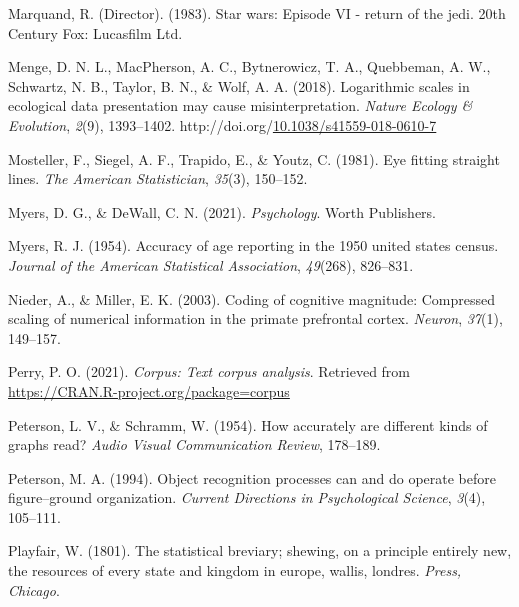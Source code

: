\documentclass[print]{nuthesis}
\newlength{\cslhangindent}
\newenvironment{CSLReferences}[2]%
{\setlength{\parindent}{0pt}%
\everypar{\setlength{\hangindent}{\cslhangindent}}\ignorespaces}%
{\par}
\begin{document}
\begin{CSLReferences}{1}{0}
\leavevmode{}%
Marquand, R. (Director). (1983). Star wars: Episode VI - return of the jedi. 20th Century Fox: Lucasfilm Ltd.

\leavevmode{}%
Menge, D. N. L., MacPherson, A. C., Bytnerowicz, T. A., Quebbeman, A. W., Schwartz, N. B., Taylor, B. N., \& Wolf, A. A. (2018). Logarithmic scales in ecological data presentation may cause misinterpretation. \emph{Nature Ecology \& Evolution}, \emph{2}(9), 1393--1402. http://doi.org/\href{https://doi.org/10.1038/s41559-018-0610-7}{10.1038/s41559-018-0610-7}

\leavevmode{}%
Mosteller, F., Siegel, A. F., Trapido, E., \& Youtz, C. (1981). Eye fitting straight lines. \emph{The American Statistician}, \emph{35}(3), 150--152.

\leavevmode{}%
Myers, D. G., \& DeWall, C. N. (2021). \emph{Psychology}. Worth Publishers.

\leavevmode{}%
Myers, R. J. (1954). Accuracy of age reporting in the 1950 united states census. \emph{Journal of the American Statistical Association}, \emph{49}(268), 826--831.

\leavevmode{}%
Nieder, A., \& Miller, E. K. (2003). Coding of cognitive magnitude: Compressed scaling of numerical information in the primate prefrontal cortex. \emph{Neuron}, \emph{37}(1), 149--157.

\leavevmode{}%
Perry, P. O. (2021). \emph{Corpus: Text corpus analysis}. Retrieved from \url{https://CRAN.R-project.org/package=corpus}

\leavevmode{}%
Peterson, L. V., \& Schramm, W. (1954). How accurately are different kinds of graphs read? \emph{Audio Visual Communication Review}, 178--189.

\leavevmode{}%
Peterson, M. A. (1994). Object recognition processes can and do operate before figure--ground organization. \emph{Current Directions in Psychological Science}, \emph{3}(4), 105--111.

\leavevmode{}%
Playfair, W. (1801). The statistical breviary; shewing, on a principle entirely new, the resources of every state and kingdom in europe, wallis, londres. \emph{Press, Chicago}.


\end{CSLReferences}
\end{document}

